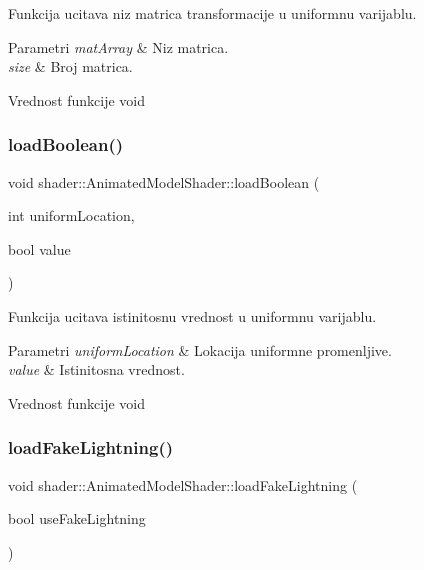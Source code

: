 Funkcija ucitava niz matrica transformacije u uniformnu varijablu. 


\begin{DoxyParams}{Parametri}
{\em mat\+Array} & Niz matrica. \\
\hline
{\em size} & Broj matrica. \\
\hline
\end{DoxyParams}
\begin{DoxyReturn}{Vrednost funkcije}
void 
\end{DoxyReturn}
\mbox{\label{classshader_1_1AnimatedModelShader_a0ba6b4419f5bfbc3c17077498ebe0451}} 
\subsubsection{\texorpdfstring{load\+Boolean()}{loadBoolean()}}
{\footnotesize\ttfamily void shader\+::\+Animated\+Model\+Shader\+::load\+Boolean (\begin{DoxyParamCaption}\item[{int}]{uniform\+Location,  }\item[{bool}]{value }\end{DoxyParamCaption})}



Funkcija ucitava istinitosnu vrednost u uniformnu varijablu. 


\begin{DoxyParams}{Parametri}
{\em uniform\+Location} & Lokacija uniformne promenljive. \\
\hline
{\em value} & Istinitosna vrednost. \\
\hline
\end{DoxyParams}
\begin{DoxyReturn}{Vrednost funkcije}
void 
\end{DoxyReturn}
\mbox{\label{classshader_1_1AnimatedModelShader_afbf5ce0c44c1d9ab564dd19a6398a088}} 
\subsubsection{\texorpdfstring{load\+Fake\+Lightning()}{loadFakeLightning()}}
{\footnotesize\ttfamily void shader\+::\+Animated\+Model\+Shader\+::load\+Fake\+Lightning (\begin{DoxyParamCaption}\item[{bool}]{use\+Fake\+Lightning }\end{DoxyParamCaption})}



